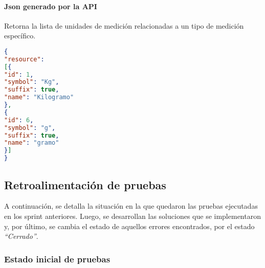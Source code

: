 \paragraph{Json generado por la API} 

Retorna la lista de unidades de medición relacionadas a un tipo de medición específico.

\begin{lstlisting}[language=json, caption=Json generado por la api, label=unitPeso]
{
"resource": 
[{
"id": 1,
"symbol": "Kg",
"suffix": true,
"name": "Kilogramo"
},
{
"id": 6,
"symbol": "g",
"suffix": true,
"name": "gramo"
}]
}
\end{lstlisting}


\subsection{Retroalimentación de pruebas}

A continuación, se detalla la situación en la que quedaron las pruebas ejecutadas en los sprint anteriores.
Luego, se desarrollan las soluciones que se implementaron y, por último, se cambia el estado de aquellos errores encontrados, por el estado \textit{``Cerrado''}.

\subsubsection{Estado inicial de pruebas}


